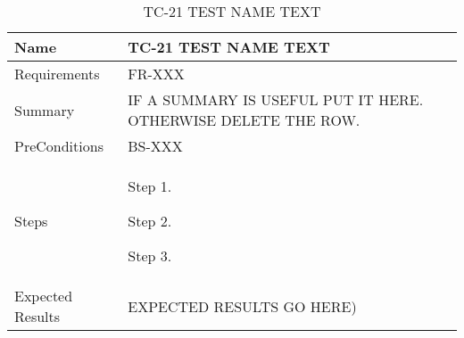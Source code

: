 \begin{table}[htbp!]
\centering
      \begin{tabular}{|p{1.05 in} |p{4.75 in} |}
      \hline
         \rowcolor[rgb]{0.8,0.8,0.8} Name & TC-21 TEST NAME TEXT\\
         \hline
         Requirements & FR-XXX\\  \hline
         Summary & IF A SUMMARY IS USEFUL PUT IT HERE.  OTHERWISE DELETE THE ROW.\\  \hline
         PreConditions & BS-XXX\\     \hline
         Steps &
         \begin{compactenum}
             \item Step 1.
             \item Step 2.
             \item Step 3.
         \end{compactenum}
         \\ \hline
         Expected Results & EXPECTED RESULTS GO HERE)\\
      \hline
      \end{tabular}
      \label{Table:TC-21}
      \caption{TC-21 TEST NAME TEXT}
\end{table} 